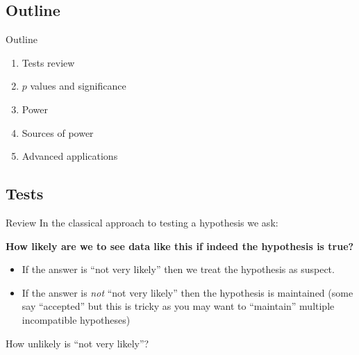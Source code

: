 \documentclass[
  11pt,
  ignorenonframetext,
]{beamer}
\providecommand{\tightlist}{%
  \setlength{\itemsep}{0pt}\setlength{\parskip}{0pt}}\usepackage{longtable,booktabs,array}
\begin{document}
\hypertarget{outline}{%
\subsection{Outline}\label{outline}}

\begin{frame}{Outline}
\begin{enumerate}
\tightlist
\item
  Tests review
\item
  \(p\) values and significance
\item
  Power
\item
  Sources of power
\item
  Advanced applications
\end{enumerate}
\end{frame}

\hypertarget{tests}{%
\subsection{Tests}\label{tests}}

\begin{frame}{Review}
\protect\hypertarget{review}{}
In the classical approach to testing a hypothesis we ask:

\textbf{How likely are we to see data like this if indeed the hypothesis
is true?}

\begin{itemize}
\tightlist
\item
  If the answer is ``not very likely'' then we treat the hypothesis as
  suspect.
\item
  If the answer is \emph{not} ``not very likely'' then the hypothesis is
  maintained (some say ``accepted'' but this is tricky as you may want
  to ``maintain'' multiple incompatible hypotheses)
\end{itemize}

How unlikely is ``not very likely''?
\end{frame}
\end{document}
